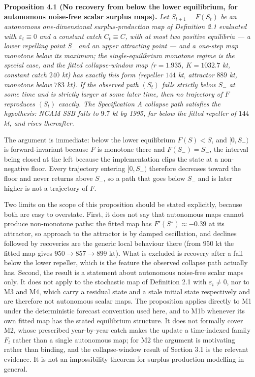 \documentclass[11pt]{article}
\begin{document}
\textbf{Proposition 4.1 (No recovery from below the lower equilibrium,
for autonomous noise-free scalar surplus maps).} \emph{Let
\(S_{t+1}=F(S_t)\) be an autonomous one-dimensional surplus-production
map of Definition 2.1 evaluated with \(\varepsilon_t \equiv 0\) and a
constant catch \(C_t \equiv C\), with at most two positive equilibria --- a lower
repelling point \(S_-\) and an upper attracting point --- and a one-step
map monotone below its maximum; the single-equilibrium monotone regime
is the special case, and the fitted collapse-window map (\(r = 1.935\),
\(K = 1032.7\) kt, constant catch \(240\) kt) has exactly this form
(repeller \(144\) kt, attractor \(889\) kt, monotone below \(783\) kt).
If the observed path \((S_t)\) falls strictly below \(S_-\) at some
time and is strictly larger at some later time, then no trajectory of
\(F\) reproduces \((S_t)\) exactly. The Specification A collapse path
satisfies the hypothesis: NCAM SSB falls to \(9.7\) kt by 1995, far
below the fitted repeller of \(144\) kt, and rises thereafter. }

The argument is immediate: below the lower equilibrium \(F(S) < S\), and
\([0, S_-)\) is forward-invariant because \(F\) is monotone there and
\(F(S_-) = S_-\), the interval being closed at the left because the
implementation clips the state at a non-negative floor. Every trajectory
entering \([0, S_-)\) therefore decreases toward the floor and never
returns above \(S_-\), so a path that goes below \(S_-\) and is later
higher is not a trajectory of \(F\).

Two limits on the scope of this proposition should be stated
explicitly, because both are easy to overstate. First, it does not say
that autonomous maps cannot produce non-monotone paths: the fitted map
has \(F'(S^\star) \approx -0.39\) at its attractor, so approach to the
attractor is by damped oscillation, and declines followed by recoveries
are the generic local behaviour there (from \(950\) kt the fitted map
gives \(950 \to 857 \to 899\) kt). What is excluded is recovery after a
fall below the lower repeller, which is the feature the observed
collapse path actually has. Second, the result is a statement about
autonomous noise-free scalar maps only. It does not apply to the
stochastic map of Definition 2.1 with \(\varepsilon_t \neq 0\), nor to
M3 and M4, which carry a residual state and a stale initial state
respectively and are therefore not autonomous scalar maps. The
proposition applies directly to M1 under the deterministic forecast
convention used here, and to M1b whenever its own fitted map has the
stated equilibrium structure. It does not formally cover M2, whose
prescribed year-by-year catch makes the update a time-indexed family
\(F_t\) rather than a single autonomous map; for M2 the argument is
motivating rather than binding, and the collapse-window result of
Section 3.1 is the relevant evidence. It is not an impossibility
theorem for surplus-production modelling in general.
\end{document}
